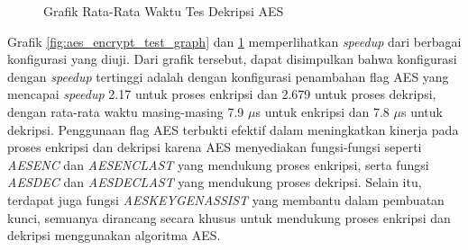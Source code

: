 \begin{figure}
    \centering
    \caption{Grafik Rata-Rata Waktu Tes Dekripsi AES}
    \label{fig:aes_decrypt_test_graph}
\end{figure}

Grafik \ref{fig:aes_encrypt_test_graph} dan \ref{fig:aes_decrypt_test_graph} memperlihatkan \textit{speedup} dari berbagai konfigurasi yang diuji. Dari grafik tersebut, dapat disimpulkan bahwa konfigurasi dengan \textit{speedup} tertinggi adalah dengan konfigurasi penambahan flag AES yang mencapai \textit{speedup} 2.17 untuk proses enkripsi dan 2.679 untuk proses dekripsi, dengan rata-rata waktu masing-masing 7.9 $\mu$s untuk enkripsi dan 7.8 $\mu$s untuk dekripsi. Penggunaan flag AES terbukti efektif dalam meningkatkan kinerja pada proses enkripsi dan dekripsi karena AES menyediakan fungsi-fungsi seperti \textit{AESENC} dan \textit{AESENCLAST} yang mendukung proses enkripsi, serta fungsi \textit{AESDEC} dan \textit{AESDECLAST} yang mendukung proses dekripsi. Selain itu, terdapat juga fungsi \textit{AESKEYGENASSIST} yang membantu dalam pembuatan kunci, semuanya dirancang secara khusus untuk mendukung proses enkripsi dan dekripsi menggunakan algoritma AES.

\iffalse

